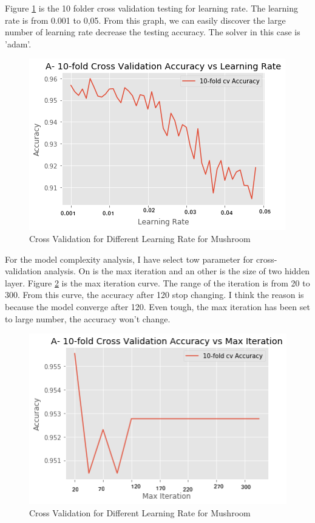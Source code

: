 \documentclass[10pt, conference, compsocconf]{IEEEtran}
\begin{document}
Figure \ref{fig:mush_nn_learing_rate} is the 10 folder cross validation testing for learning rate. The learning rate is from 0.001 to 0,05. From this graph, we can easily discover the large number of learning rate decrease the testing accuracy. The solver in this case is 'adam'. 

\begin{figure}[h]
	\centering
	\includegraphics[scale = 0.5]{image/mush_nn_learning_rate.png}
	\caption{Cross Validation for Different Learning Rate for Mushroom}
	\label{fig:mush_nn_learing_rate}
\end{figure}

For the model complexity analysis, I have select tow parameter for cross-validation analysis. On is the max iteration and an other is the size of two hidden layer. Figure \ref{fig:mush_nn_learing_maxIter} is the max iteration curve. The range of the iteration is from 20 to 300. From this curve, the accuracy after 120 stop changing. I think the reason is because the model converge after 120. Even tough, the max iteration has been set to large number, the accuracy won't change. 
\begin{figure}[h]
	\centering
	\includegraphics[scale = 0.5]{image/mush_nn_maxiteration.png}
	\caption{Cross Validation for Different Learning Rate for Mushroom}
	\label{fig:mush_nn_learing_maxIter}
\end{figure}
\end{document}
